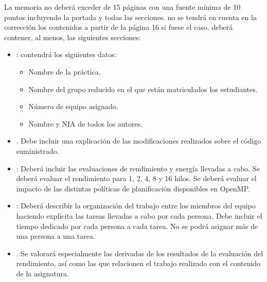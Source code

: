 La memoria no deberá exceder de 15 páginas con una fuente mínima de 10 puntos
incluyendo la portada y todas las secciones.  no se tendrá en cuenta en la
corrección los contenidos a partir de la página 16 si fuese el caso.  deberá
contener, al menos, las siguientes secciones: 

\begin{itemize}

\item {}: contendrá los siguientes datos:
  \begin{itemize}
    \item Nombre de la práctica.
    \item Nombre del grupo reducido en el que están matriculados los estudiantes.
    \item Número de equipo asignado.
    \item Nombre y NIA de todos los autores.
  \end{itemize}

\item {}.
      Debe incluir una explicación de las modificaciones realizados sobre
      el código suministrado. 

\item {}: 
      Deberá incluir las evaluaciones de rendimiento y energía llevadas a cabo.
      Se deberá evaluar el rendimiento para 1, 2, 4, 8 y 16 hilos.
      Se deberá evaluar el impacto de las distintas políticas de planificación 
      disponibles en OpenMP.

\item {}:
      Deberá describir la organización del trabajo entre los miembros del equipo
      haciendo explícita las tareas llevadas a cabo por cada persona.
      Debe incluir el tiempo dedicado por cada persona a cada tarea.
      No se podrá asignar más de una persona a una tarea.

\item {}.
      Se valorará especialmente las derivadas de los resultados de la evaluación
      del rendimiento, así como las que relacionen el trabajo realizado con el contenido
      de la asignatura.

\end{itemize}
